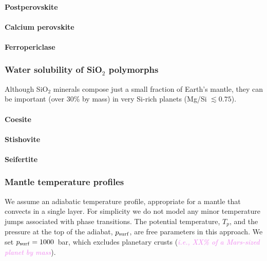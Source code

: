 \documentclass[linenumbers]{aastex631}
\newcommand{\todo}[1]{\textit{\textcolor{violet}{{#1}}}}
\begin{document}
\paragraph{Postperovskite}

\paragraph{Calcium perovskite}

\paragraph{Ferropericlase}


\subsubsection{Water solubility of SiO$_2$ polymorphs}
Although SiO$_2$ minerals compose just a small fraction of Earth's mantle, they can be important (over 30\% by mass) in very Si-rich planets (Mg/Si $\lesssim 0.75$).

\paragraph{Coesite}

\paragraph{Stishovite}

\paragraph{Seifertite}






\subsubsection{Mantle temperature profiles}

We assume an adiabatic temperature profile, appropriate for a mantle that convects in a single layer. For simplicity we do not model any minor temperature jumps associated with phase transitions. The potential temperature, $T_p$, and the pressure at the top of the adiabat, $p_{\rm surf}$, are free parameters in this approach. We set $p_{\rm surf} = 1000$~bar, which excludes planetary crusts (\todo{i.e., XX\% of a Mars-sized planet by mass}). 
\end{document}
